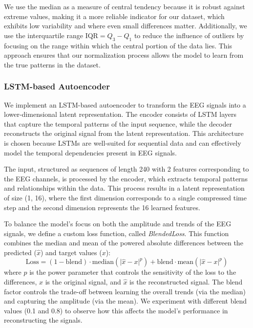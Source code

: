 We use the median as a measure of central tendency because it is robust against extreme values, making it a more reliable indicator for our dataset, which exhibits low variability and where even small differences matter. Additionally, we use the interquartile range $\text{IQR} = Q_3 - Q_1$ to reduce the influence of outliers by focusing on the range within which the central portion of the data lies. This approach ensures that our normalization process allows the model to learn from the true patterns in the dataset.

\subsubsection{LSTM-based Autoencoder}

We implement an LSTM-based autoencoder to transform the EEG signals into a lower-dimensional latent representation. The encoder consists of LSTM layers that capture the temporal patterns of the input sequence, while the decoder reconstructs the original signal from the latent representation. This architecture is chosen because LSTMs are well-suited for sequential data and can effectively model the temporal dependencies present in EEG signals.

The input, structured as sequences of length 240 with 2 features corresponding to the EEG channels, is processed by the encoder, which extracts temporal patterns and relationships within the data. This process results in a latent representation of size (1, 16), where the first dimension corresponds to a single compressed time step and the second dimension represents the 16 learned features.

To balance the model's focus on both the amplitude and trends of the EEG signals, we define a custom loss function, called \emph{BlendedLoss}. This function combines the median and mean of the powered absolute differences between the predicted ($\hat{x}$) and target values ($x$):
%
\begin{equation}
\text{Loss} = (1 - \text{blend}) \cdot \text{median}(\lvert \hat{x} - x \rvert^p) + \text{blend} \cdot \text{mean}(\lvert \hat{x} - x \rvert^p)
\end{equation}
%
where $p$ is the power parameter that controls the sensitivity of the loss to the differences, $x$ is the original signal, and $\hat{x}$ is the reconstructed signal. The blend factor controls the trade-off between learning the overall trends (via the median) and capturing the amplitude (via the mean). We experiment with different blend values (0.1 and 0.8) to observe how this affects the model’s performance in reconstructing the signals.

